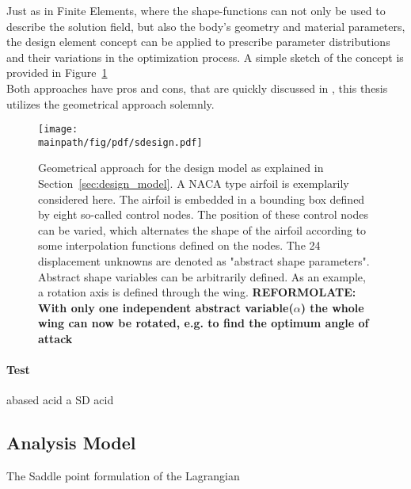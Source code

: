 \documentclass[../main.tex]{subfiles}
\begin{document}
Just as in Finite Elements, where the shape-functions can not only be used to describe the solution field, but also the body's geometry and material parameters, the design element concept can be applied to prescribe parameter distributions and their variations in the optimization process. A simple sketch of the concept is provided in Figure~\ref{fig:sketch_geometrical_approach}
\\
Both approaches have pros and cons, that are quickly discussed in \cite{Maute2003}, this thesis utilizes the geometrical approach solemnly.

\begin{figure}[h!]
	\begin{center}
        \texttt{[image: \\mainpath/fig/pdf/sdesign.pdf]}
        \caption[Design-model: geometrical approach]{Geometrical approach for the design model as explained in Section~\ref{sec:design_model}. A NACA type airfoil is exemplarily considered here. The airfoil is embedded in a bounding box defined by eight so-called control nodes. The position of these control nodes can be varied, which alternates the shape of the airfoil according to some interpolation functions defined on the nodes. The 24 displacement unknowns are denoted as "abstract shape parameters". Abstract shape variables can be arbitrarily defined. As an example, a rotation axis is defined through the wing. \textbf{REFORMOLATE: With only one independent abstract variable($\alpha$) the whole wing can now be rotated, e.g. to find the optimum angle of attack}}
		\label{fig:sketch_geometrical_approach}
    \end{center}
\end{figure}

\paragraph{Test}
abased
acid
a
SD
acid

\subsection{Analysis Model}\label{sec:analysis_model}



The Saddle point formulation of the Lagrangian
\end{document}
